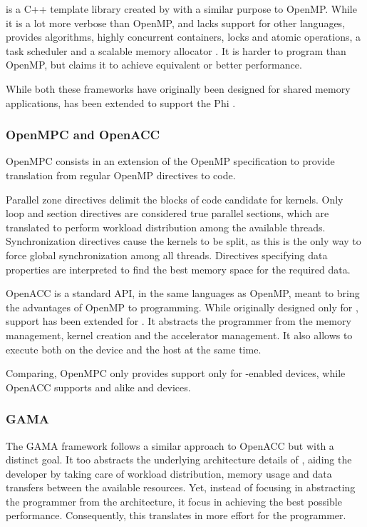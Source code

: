 \tbb is a C++ template library created by \intel with a similar purpose to OpenMP. While it is a lot more verbose than OpenMP, and lacks support for other languages, \tbb provides algorithms, highly concurrent containers, locks and atomic operations, a task scheduler and a scalable memory allocator \cite{TBB}. It is harder to program than OpenMP, but \intel claims it to achieve equivalent or better performance.

While both these frameworks have originally been designed for shared memory applications, \tbb has been extended to support the \xeon Phi \cite{Intel:XeonPhi:DevGuide}.

\subsubsection{OpenMPC and OpenACC}
OpenMPC\cite{OpenMPC} consists in an extension of the OpenMP specification to provide translation from  regular OpenMP directives to \cuda code.

Parallel zone directives delimit the blocks of code candidate for \cuda kernels. Only loop and section directives are considered true parallel sections, which are translated to perform workload distribution among the available threads. Synchronization directives cause the kernels to be split, as this is the only way to force global synchronization among all threads. Directives specifying data properties are interpreted to find the best \gpu memory space for the required data.

OpenACC\cite{OpenACC:1.0} is a standard API, in the same languages as OpenMP, meant to bring the advantages of OpenMP to \gpu programming. While originally designed only for \gpus, support has been extended for \mics. It abstracts the programmer from the memory management, kernel creation and the accelerator management. It also allows to execute both on the device and the \gpu host at the same time.


Comparing, OpenMPC only provides support only for \cuda-enabled devices, while OpenACC supports \nvidia and \amd\gpus alike and \intel\mic devices.

\subsubsection{GAMA}
The \ac{GAMA} framework follows a similar approach to OpenACC but with a distinct goal. It too abstracts the underlying architecture details of \hetplats, aiding the developer by taking care of workload distribution, memory usage and data transfers between the available resources. Yet, instead of focusing in abstracting the programmer from the architecture, it focus in achieving the best possible performance. Consequently, this translates in more effort for the programmer.
